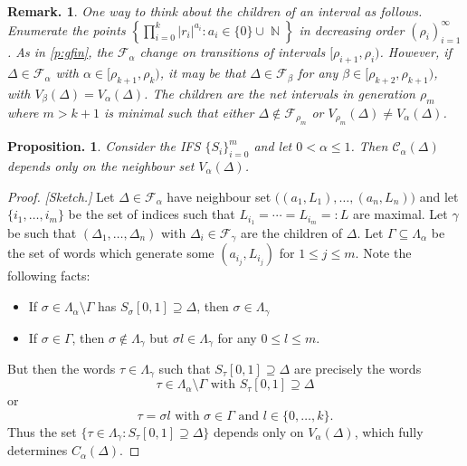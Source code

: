 \documentclass[11pt, a4paper]{memoir}
\DeclareMathOperator{\N}{{\mathbb{N}}}
\theoremstyle{change}
\newtheorem{proposition}[theorem]{Proposition.}
\theoremstyle{plain}
\theoremstyle{nonumberplain}
\newtheorem{remark}{Remark.}
\newtheorem{proof}{Proof}
\numberwithin{equation}{section}
\begin{document}
\begin{remark}
    One way to think about the children of an interval as follows.
    Enumerate the points $\left\{\prod_{i=0}^k|r_i|^{a_i}:a_i\in\{0\}\cup\N\right\}$ in decreasing order $(\rho_i)_{i=1}^\infty$.
    As in \cref{p:gfin}, the $\mathcal{F}_\alpha$ change on transitions of intervals $[\rho_{i+1},\rho_{i})$.
    However, if $\Delta\in\mathcal{F}_\alpha$ with $\alpha\in[\rho_{k+1},\rho_k)$, it may be that $\Delta\in \mathcal{F}_\beta$ for any $\beta\in[\rho_{k+2},\rho_{k+1})$, with $V_\beta(\Delta)=V_\alpha(\Delta)$.
    The children are the net intervals in generation $\rho_{m}$ where $m> k+1$ is minimal such that either $\Delta\notin\mathcal{F}_{\rho_m}$ or $V_{\rho_m}(\Delta)\neq V_\alpha(\Delta)$.
\end{remark}
\begin{proposition}\label{p:ttype}
    Consider the IFS $\{S_i\}_{i=0}^m$ and let $0<\alpha\leq 1$.
    Then $\mathcal{C}_\alpha(\Delta)$ depends only on the neighbour set $V_\alpha(\Delta)$.
\end{proposition}
\begin{proof}
    \textit{[Sketch.]}
    Let $\Delta\in \mathcal{F}_\alpha$ have neighbour set $\bigl((a_1,L_1),\ldots,(a_n,L_n)\bigr)$ and let $\{i_1,\ldots,i_m\}$ be the set of indices such that $L_{i_1}=\cdots=L_{i_m}=:L$ are maximal.
    Let $\gamma$ be such that $(\Delta_1,\ldots,\Delta_n)$ with $\Delta_i\in\mathcal{F}_\gamma$ are the children of $\Delta$.
    Let $\Gamma\subseteq\Lambda_\alpha$ be the set of words which generate some $(a_{i_j},L_{i_j})$ for $1\leq j\leq m$.
    Note the following facts:
    \begin{itemize}[nl]
        \item If $\sigma\in\Lambda_\alpha\setminus\Gamma$ has $S_\sigma[0,1]\supseteq\Delta$, then $\sigma\in\Lambda_\gamma$
        \item If $\sigma\in\Gamma$, then $\sigma\notin\Lambda_\gamma$ but $\sigma l\in\Lambda_\gamma$ for any $0\leq l\leq m$.
    \end{itemize}
    But then the words $\tau\in\Lambda_\gamma$ such that $S_\tau[0,1]\supseteq\Delta$ are precisely the words
    \begin{equation*}
        \tau \in\Lambda_\alpha\setminus\Gamma\text{ with } S_\tau[0,1]\supseteq\Delta
    \end{equation*}
    or
    \begin{equation*}
        \tau=\sigma l\text{ with }\sigma\in\Gamma\text{ and }l\in\{0,\ldots,k\}.
    \end{equation*}
    Thus the set $\{\tau\in\Lambda_\gamma:S_\tau[0,1]\supseteq\Delta\}$ depends only on $V_\alpha(\Delta)$, which fully determines $C_\alpha(\Delta)$.
\end{proof}
\end{document}

